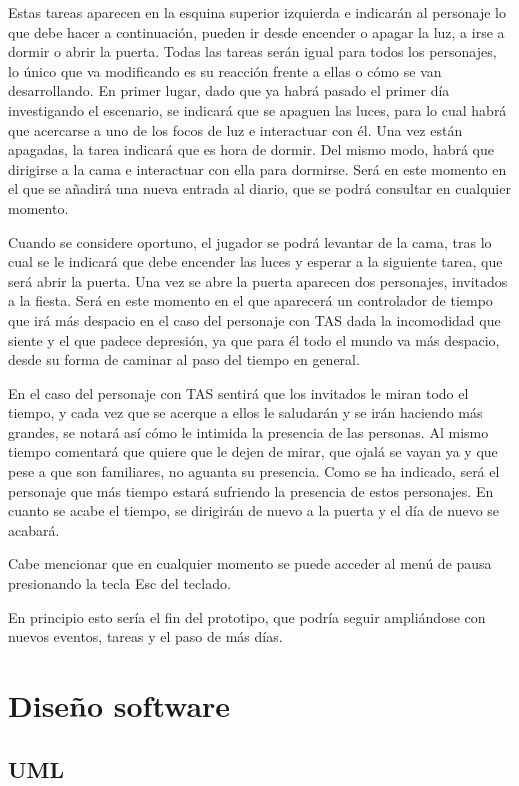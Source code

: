 \documentclass[12pt, a4paper,twoside,titlepage]{book}
\begin{document}
Estas tareas aparecen en la esquina superior izquierda e indicarán al personaje lo que debe hacer a continuación, pueden ir desde encender o apagar la luz, a irse a dormir o abrir la puerta. Todas las tareas serán igual para todos los personajes, lo único que va modificando es su reacción frente a ellas o cómo se van desarrollando. En primer lugar, dado que ya habrá pasado el primer día investigando el escenario, se indicará que se apaguen las luces, para lo cual habrá que acercarse a uno de los focos de luz e interactuar con él. Una vez están apagadas, la tarea indicará que es hora de dormir. Del mismo modo, habrá que dirigirse a la cama e interactuar con ella para dormirse. Será en este momento en el que se añadirá una nueva entrada al diario, que se podrá consultar en cualquier momento. 

Cuando se considere oportuno, el jugador se podrá levantar de la cama, tras lo cual se le indicará que debe encender las luces y esperar a la siguiente tarea, que será abrir la puerta. Una vez se abre la puerta aparecen dos personajes, invitados a la fiesta. Será en este momento en el que aparecerá un controlador de tiempo que irá más despacio en el caso del personaje con TAS dada la incomodidad que siente y el que padece depresión, ya que para él todo el mundo va más despacio, desde su forma de caminar al paso del tiempo en general.

En el caso del personaje con TAS sentirá que los invitados le miran todo el tiempo, y cada vez que se acerque a ellos le saludarán y se irán haciendo más grandes, se notará así cómo le intimida la presencia de las personas. Al mismo tiempo comentará que quiere que le dejen de mirar, que ojalá se vayan ya y que pese a que son familiares, no aguanta su presencia. Como se ha indicado, será el personaje que más tiempo estará sufriendo la presencia de estos personajes. En cuanto se acabe el tiempo, se dirigirán de nuevo a la puerta y el día de nuevo se acabará. 

Cabe mencionar que en cualquier momento se puede acceder al menú de pausa presionando la tecla Esc del teclado. 
 
En principio esto sería el fin del prototipo, que podría seguir ampliándose con nuevos eventos, tareas y el paso de más días. 


\section{Diseño software}
\label{sec:diseñoSw}
\subsection{UML}
\end{document}
